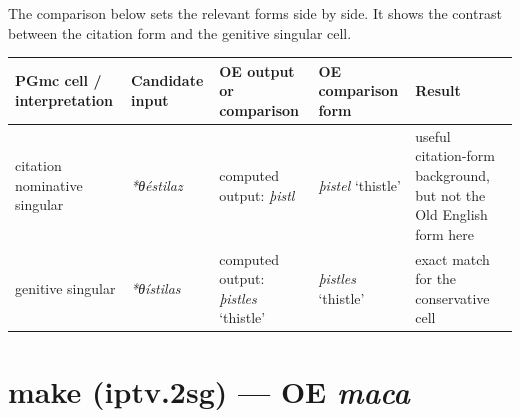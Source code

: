 \documentclass[
  british,
  a4paper,
  openany]{book}
\newcounter{none} %
\providecommand{\texorpdfstring}[2]{#1}
\begin{document}
The comparison below sets the relevant forms side by side. It shows the
contrast between the citation form and the genitive singular cell.

{\def\LTcaptype{none} %
\begin{longtable}[]{@{}
  >{\raggedright\arraybackslash}p{}
  >{\raggedright\arraybackslash}p{}
  >{\raggedright\arraybackslash}p{}
  >{\raggedright\arraybackslash}p{}
  >{\raggedright\arraybackslash}p{}@{}}
\toprule\noalign{}
\begin{minipage}[b]{\linewidth}\raggedright
PGmc cell / interpretation
\end{minipage} & \begin{minipage}[b]{\linewidth}\raggedright
Candidate input
\end{minipage} & \begin{minipage}[b]{\linewidth}\raggedright
OE output or comparison
\end{minipage} & \begin{minipage}[b]{\linewidth}\raggedright
OE comparison form
\end{minipage} & \begin{minipage}[b]{\linewidth}\raggedright
Result
\end{minipage} \\
\midrule\noalign{}
\endhead
\bottomrule\noalign{}
\endlastfoot
citation nominative singular & {\emph{*θéstilaz}} & computed output:
{\emph{þistl}} & {\emph{þistel}} `thistle' & useful citation-form
background, but not the Old English form here \\
genitive singular & {\emph{*θístilas}} & computed output:
{\emph{þistles}} `thistle' & {\emph{þistles}} `thistle' & exact match
for the conservative cell \\
\end{longtable}
}

\section{\texorpdfstring{make (iptv.2sg) --- OE
\emph{maca}}{make (iptv.2sg) --- OE maca}}\label{make-iptv.2sg-oe-maca}

\end{document}
